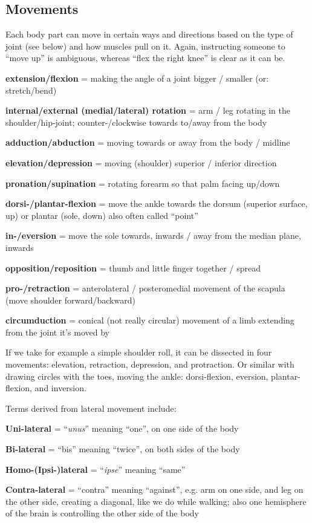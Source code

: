\subsection{Movements}

Each body part can move in certain ways and directions based on the type of joint (see below) and how muscles pull on it.
Again, instructing someone to ``move up'' is ambiguous, whereas ``flex the right knee'' is clear as it can be.

\begin{itemize*}
    \item \textbf{extension/flexion} = making the angle of a joint bigger / smaller (or: stretch/bend)
    \item \textbf{internal/external (medial/lateral) rotation} = arm / leg rotating in the shoulder/hip-joint; counter-/clockwise towards to/away from the body
    \item \textbf{adduction/abduction} = moving towards or away from the body / midline
    \item \textbf{elevation/depression} = moving (shoulder) superior / inferior direction
    \item \textbf{pronation/supination} = rotating forearm so that palm facing up/down
    \item \textbf{dorsi-/plantar-flexion} = move the ankle towards the dorsum (superior surface, up) or plantar (sole, down) also often called ``point''
    \item \textbf{in-/eversion} = move the sole towards, inwards / away from the median plane, inwards
    \item \textbf{opposition/reposition} = thumb and little finger together / spread
    \item \textbf{pro-/retraction} = anterolateral / posteromedial movement of the scapula (move shoulder forward/backward)
    \item \textbf{circumduction} = conical (not really circular) movement of a limb extending from the joint it's moved by
\end{itemize*}

If we take for example a simple shoulder roll, it can be dissected in four movements: elevation, retraction, depression, and protraction.
Or similar with drawing circles with the toes, moving the ankle: dorsi-flexion, eversion, plantar-flexion, and inversion.

Terms derived from lateral movement include:

\begin{itemize*}
    \item \textbf{Uni-lateral} = ``\textit{unus}'' meaning ``one'', on one side of the body
    \item \textbf{Bi-lateral} = ``bis'' meaning ``twice'', on both sides of the body
    \item \textbf{Homo-(Ipsi-)lateral} = ``\textit{ipse}'' meaning ``same''
    \item \textbf{Contra-lateral} = ``contra'' meaning ``against'', e.g. arm on one side, and leg on the other side, creating a diagonal, like we do while walking; also one hemisphere of the brain is controlling the other side of the body
\end{itemize*}

